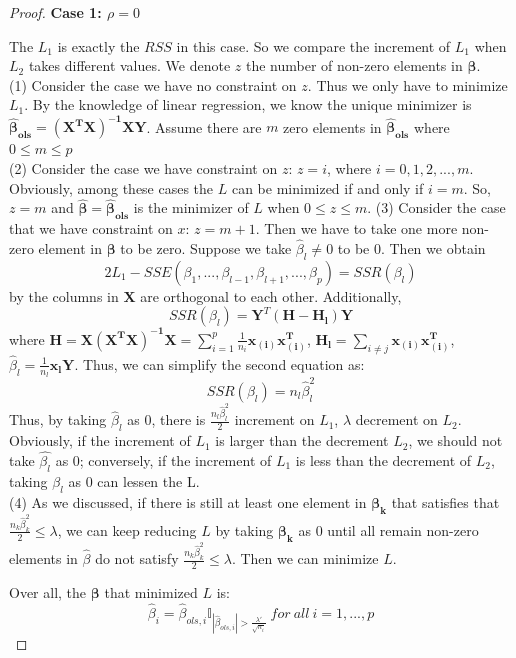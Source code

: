 \documentclass{article}
\newtheorem{proof}{Proof}
\begin{document}
\begin{appendices}
\begin{proof}
	
\textbf{Case 1: $\rho=0$}\par 
The $L_1$ is exactly the $RSS$ in this case. So we compare the increment of $L_1$  when $L_2$ takes different values. We denote $z$ the number of  non-zero elements in $\bm{\beta}$.\\
	(1) Consider the case we have no constraint on $z$. Thus we only have to minimize $L_1$. By the knowledge of linear regression, we know the unique minimizer is $\bm{\hat{\beta}_{ols}}=\mathbf{(X^TX)^{-1}XY}$. Assume there are $m$ zero elements in $\bm{\hat{\beta}_{ols}}$ where $0\leq m \leq p$ \\
	(2) Consider the case we have constraint on $z$: $z = i$, where $i=0,1,2,...,m$. Obviously, among these cases the $L$ can be minimized if and only if $i=m$. So, $z=m$ and $\bm{\hat{\beta}}=\bm{\hat{\beta}_{ols}}$ is the minimizer of $L$ when $0\leq z\leq m$.
	(3) Consider the case that we have constraint on $x$: $z=m+1$. Then we have to take one more non-zero element in $\bm{\beta}$ to be zero. Suppose we take $\hat{\beta}_l \neq 0$ to be 0. Then we obtain 
	\begin{equation*}
		2L_1 -SSE(\beta_1,...,\beta_{l-1},\beta_{l+1},...,\beta_p)=SSR(\beta_l)
	\end{equation*}
	by the columns in $\mathbf{X}$ are orthogonal to each other. Additionally,
	\begin{equation*}
		SSR(\beta_l) = \mathbf{Y}^T(\mathbf{H-H_l})\mathbf{Y} 
	\end{equation*}
	where $\mathbf{H=X(X^TX)^{-1}X}=\sum_{i=1}^p\frac{1}{n_i}\mathbf{x_{(i)}x_{(i)}^T}$, $\mathbf{H_l} = \sum_{i\neq j}\mathbf{x_{(i)}x_{(i)}^T}$, $\hat{\beta}_l = \frac{1}{n_l}\mathbf{x_{l}Y}$. Thus, we can simplify the second equation as:
	\begin{equation*}
		SSR(\beta_l) = n_l\hat{\beta}_l^2
	\end{equation*}
	Thus, by taking $\hat{\beta}_l$ as 0, there is $\frac{n_l\hat{\beta}_l^2}{2}$ increment on $L_1$, $\lambda$ decrement on $L_2$. Obviously, if the increment of $L_1$ is larger than the decrement $L_2$, we should not take $\hat{\beta_l}$ as 0; conversely, if the increment of $L_1$ is less than the decrement of $L_2$, taking $\hat{\beta_l}$ as 0 can lessen the L.\\
	(4) As we discussed, if there is still at least one element in $\bm{\beta_k}$ that satisfies that $\frac{n_k\hat{\beta}_k^2}{2}\leq\lambda$, we can keep reducing $L$ by taking $\bm{\beta_k}$ as 0 until all remain non-zero elements in $\hat{\beta}$ do not satisfy $\frac{n_k\hat{\beta}_k^2}{2}\leq\lambda$. Then we can minimize $L$.\par 
	Over all, the $\bm{\beta}$ that minimized $L$ is:
	\begin{equation*}
			\hat{\beta}_i = \hat{\beta}_{ols,i}\mathbb{I}_{|\hat{\beta}_{ols,i}|>\frac{\lambda'}{\sqrt{n_i}}}\ for\ all\ i=1,...,p
	\end{equation*}
	

\end{proof}
\end{appendices}
\end{document}
